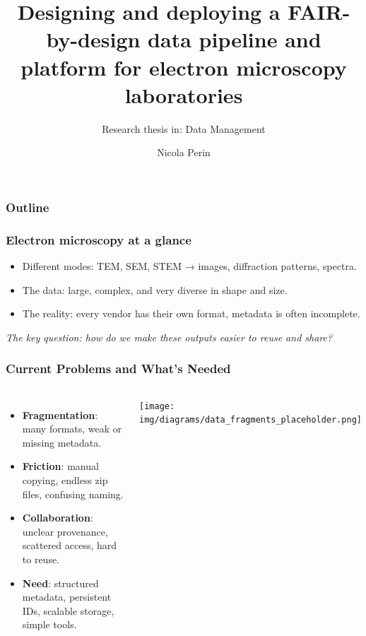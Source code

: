 \documentclass{beamer}
\title[FAIR-by-design EM pipeline]{Designing and deploying a FAIR-by-design data pipeline and platform for electron microscopy laboratories}
\subtitle{Research thesis in: Data Management}
\institute{University of Trieste}
\author[Nicola Perin]{Nicola Perin}
\begin{document}
	
	
	\begin{frame}
		\setTitlestyleDissertation
		\maketitle
	\end{frame}
	
	\begin{frame}
		\frametitle{Outline}
	\end{frame}
	
	
	
	\begin{frame}
		\frametitle{Electron microscopy at a glance}
		\begin{itemize}
			\item Different modes: TEM, SEM, STEM → images, diffraction patterns, spectra.
			\item The data: large, complex, and very diverse in shape and size.
			\item The reality: every vendor has their own format, metadata is often incomplete.
		\end{itemize}
		\vspace{0.5em}
		\small\textit{The key question: how do we make these outputs easier to reuse and share?}
	\end{frame}
	
	\begin{frame}
		\frametitle{Current Problems and What’s Needed}
		\begin{columns}[T,totalwidth=\textwidth]
			\column{0.58\textwidth}
			\begin{itemize}
				\item \textbf{Fragmentation}: many formats, weak or missing metadata.
				\item \textbf{Friction}: manual copying, endless zip files, confusing naming.
				\item \textbf{Collaboration}: unclear provenance, scattered access, hard to reuse.
				\item \textbf{Need}: structured metadata, persistent IDs, scalable storage, simple tools.
			\end{itemize}
			\column{0.42\textwidth}
			\texttt{[image: img/diagrams/data\_fragments\_placeholder.png]}%
		\end{columns}
	\end{frame}
	
\end{document}
